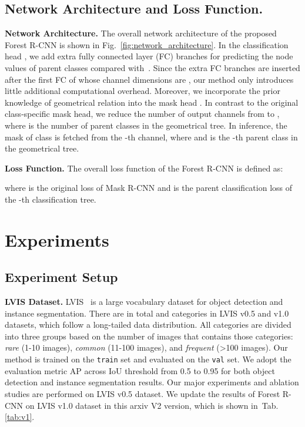 \documentclass[sigconf]{acmart}
\newcommand{\myparagraph}[1]{{\vspace{0.5em} \noindent \bf #1}}
\begin{document}
\subsection{Network Architecture and Loss Function.}
\myparagraph{Network Architecture.} The overall network architecture of the proposed Forest R-CNN is shown in Fig.~\ref{fig:network_architecture}. In the classification head , we add  extra fully connected layer (FC) branches for predicting the node values of parent classes compared with~\cite{maskrcnn}. Since the extra FC branches are inserted after the first FC of  whose channel dimensions are , our method only introduces little additional computational overhead. Moreover, we incorporate the prior knowledge of geometrical relation into the mask head . In contrast to the original class-specific mask head, we reduce the number of output channels from  to , where  is the number of parent classes in the geometrical tree. In inference, the mask of class  is fetched from the -th channel, where  and  is the -th parent class in the geometrical tree.

\myparagraph{Loss Function.} The overall loss function of the Forest R-CNN is defined as:

where  is the original loss of Mask R-CNN and  is the parent classification loss of the -th classification tree.

\section{Experiments}
\subsection{Experiment Setup}

\myparagraph{LVIS Dataset.} LVIS~\cite{lvis} is a large vocabulary dataset for object detection and instance segmentation. There are in total  and  categories in LVIS v0.5 and v1.0 datasets, which follow a long-tailed data distribution. All categories are divided into three groups based on the number of images that contains those categories: \emph{rare} (1-10 images), \emph{common} (11-100 images), and \emph{frequent} (>100 images). Our method is trained on the \texttt{train} set and evaluated on the \texttt{val} set. We adopt the evaluation metric AP across IoU threshold from 0.5 to 0.95 for both object detection and instance segmentation results. Our major experiments and ablation studies are performed on LVIS v0.5 dataset. We update the results of Forest R-CNN on LVIS v1.0 dataset in this arxiv V2 version, which is shown in~Tab.\ref{tab:v1}.
\end{document}

